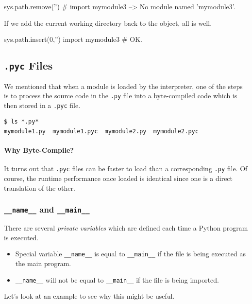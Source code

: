 \documentclass[12pt,letterpaper,twoside]{article}
\begin{document}
\begin{enumerate}
\begin{python}
sys.path.remove('')
# import mymodule3  --> No module named 'mymodule3'.
\end{python}

If we add the current working directory back to the object, all is well.

\begin{python}
sys.path.insert(0,'')
import mymodule3   # OK.
\end{python}

\subsection{\texttt{.pyc} Files}

We mentioned that when a module is loaded by the interpreter, one of the steps is to
process the source code in the \texttt{.py} file into a byte-compiled code which is
then stored in a \texttt{.pyc} file.

\begin{verbatim}
$ ls *.py*
mymodule1.py  mymodule1.pyc  mymodule2.py  mymodule2.pyc
\end{verbatim}

\paragraph{Why Byte-Compile?} It turns out that \texttt{.pyc} files can be faster
to load than a corresponding \texttt{.py} file. Of course, the runtime performance once
loaded is identical since one is a direct translation of the other.

\subsubsection{\texttt{\_\_name\_\_} and \texttt{\_\_main\_\_}}
There are several \emph{private variables} which are defined each time a Python program
is executed.

\begin{itemize}
\item
  Special variable \texttt{\_\_name\_\_} is equal to
  \texttt{\_\_main\_\_} if the file is being executed as the main
  program.
\item
  \texttt{\_\_name\_\_} will not be equal to \texttt{\_\_main\_\_} if
  the file is being imported.
\end{itemize}

Let's look at an example to see why this might be useful.


\end{enumerate}
\end{document}
